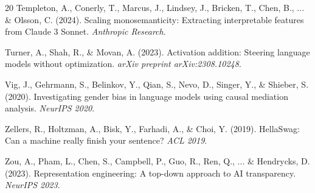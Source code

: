 \documentclass{article}
\begin{document}
\begin{thebibliography}{20}
Templeton, A., Conerly, T., Marcus, J., Lindsey, J., Bricken, T., Chen, B., ... \& Olsson, C. (2024).
\newblock Scaling monosemanticity: Extracting interpretable features from Claude 3 Sonnet.
\newblock \emph{Anthropic Research}.

Turner, A., Shah, R., \& Movan, A. (2023).
\newblock Activation addition: Steering language models without optimization.
\newblock \emph{arXiv preprint arXiv:2308.10248}.

Vig, J., Gehrmann, S., Belinkov, Y., Qian, S., Nevo, D., Singer, Y., \& Shieber, S. (2020).
\newblock Investigating gender bias in language models using causal mediation analysis.
\newblock \emph{NeurIPS 2020}.

Zellers, R., Holtzman, A., Bisk, Y., Farhadi, A., \& Choi, Y. (2019).
\newblock HellaSwag: Can a machine really finish your sentence?
\newblock \emph{ACL 2019}.

Zou, A., Pham, L., Chen, S., Campbell, P., Guo, R., Ren, Q., ... \& Hendrycks, D. (2023).
\newblock Representation engineering: A top-down approach to AI transparency.
\newblock \emph{NeurIPS 2023}.

\end{thebibliography}
\end{document}
